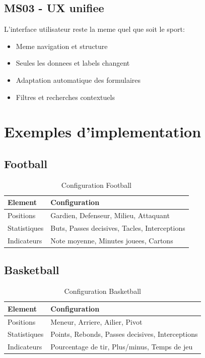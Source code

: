 \subsection*{MS03 - UX unifiee}

L'interface utilisateur reste la meme quel que soit le sport:

\begin{itemize}[leftmargin=*]
  \item Meme navigation et structure
  \item Seules les donnees et labels changent
  \item Adaptation automatique des formulaires
  \item Filtres et recherches contextuels
\end{itemize}

\section{Exemples d'implementation}

\subsection*{Football}

\begin{table}[H]
\centering
\begin{tabular}{p{} p{}}
\toprule
\textbf{Element} & \textbf{Configuration} \\
\midrule
Positions & Gardien, Defenseur, Milieu, Attaquant \\
Statistiques & Buts, Passes decisives, Tacles, Interceptions \\
Indicateurs & Note moyenne, Minutes jouees, Cartons \\
\bottomrule
\end{tabular}
\caption{Configuration Football}
\end{table}

\subsection*{Basketball}

\begin{table}[H]
\centering
\begin{tabular}{p{} p{}}
\toprule
\textbf{Element} & \textbf{Configuration} \\
\midrule
Positions & Meneur, Arriere, Ailier, Pivot \\
Statistiques & Points, Rebonds, Passes decisives, Interceptions \\
Indicateurs & Pourcentage de tir, Plus/minus, Temps de jeu \\
\bottomrule
\end{tabular}
\caption{Configuration Basketball}
\end{table}

